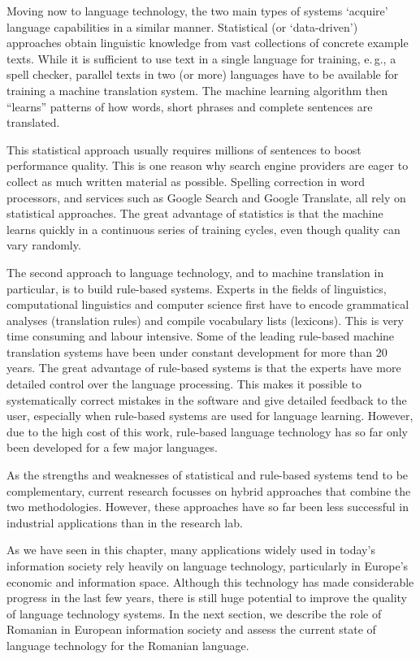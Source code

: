 \begin{multicols}{2}
Moving now to language technology, the two main types of systems `acquire' language capabilities in a similar manner. Statistical (or `data-driven') approaches obtain linguistic knowledge from vast collections of concrete example texts. While it is sufficient to use text in a single language for training, e.\,g., a spell checker, parallel texts in two (or more) languages have to be available for training a machine translation system. The machine learning algorithm then ``learns'' patterns of how words, short phrases and complete sentences are translated. 

This statistical approach usually requires millions of sentences to boost performance quality. This is one reason why search engine providers are eager to collect as much written material as possible. Spelling correction in word processors, and services such as Google Search and Google Translate, all rely on statistical approaches. The great advantage of statistics is that the machine learns quickly in a continuous series of training cycles, even though quality can vary randomly.

The second approach to language technology, and to machine translation in particular, is to build rule-based systems. Experts in the fields of linguistics, computational linguistics and computer science first have to encode grammatical analyses (translation rules) and compile vocabulary lists (lexicons). This is very time consuming and labour intensive. Some of the leading rule-based machine translation systems have been under constant development for more than 20 years. The great advantage of rule-based systems is that the experts have more detailed control over the language processing. This makes it possible to systematically correct mistakes in the software and give detailed feedback to the user, especially when rule-based systems are used for language learning. However, due to the high cost of this work, rule-based language technology has so far only been developed for a few major languages. 


As the strengths and weaknesses of statistical and rule-based systems tend to be complementary, current research focusses on hybrid approaches that combine the two methodologies. However, these approaches have so far been less successful in industrial applications than in the research lab. 

As we have seen in this chapter, many applications widely used in today’s information society rely heavily on language technology, particularly in Europe’s economic and information space. Although this technology has made considerable progress in the last few years, there is still huge potential to improve the quality of language technology systems. In the next section, we describe the role of Romanian in European information society and assess the current state of language technology for the Romanian language.
\end{multicols}

